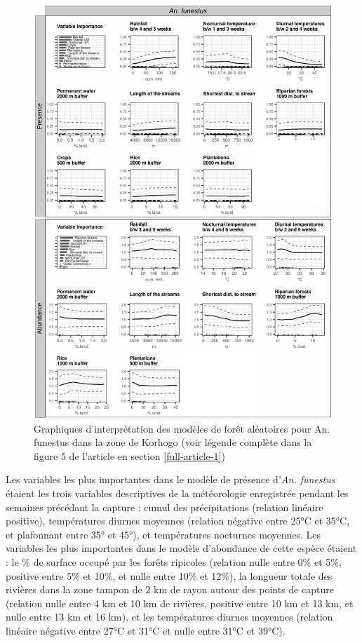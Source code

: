 \documentclass[12pt,twoside]{reedthesis}
\begin{document}
\begin{figure}

{\centering \includegraphics[width=1\linewidth]{figure/pdp_funestus_ci} 

}

\caption[Graphiques d'interprétation des modèles de forêt aléatoires pour An. funestus dans la zone de Korhogo]{Graphiques d'interprétation des modèles de forêt aléatoires pour An. funestus dans la zone de Korhogo (voir légende complète dans la figure 5 de l'article en section \ref{full-article-1})}\label{fig:pdp-ci-funestus}
\end{figure}
Les variables les plus importantes dans le modèle de présence d'\emph{An. funestus} étaient les trois variables descriptives de la météorologie enregistrée pendant les semaines précédant la capture : cumul des précipitations (relation linéaire positive), températures diurnes moyennes (relation négative entre 25°C et 35°C, et plafonnant entre 35° et 45°), et températures nocturnes moyennes. Les variables les plus importantes dans le modèle d'abondance de cette espèce étaient : le \% de surface occupé par les forêts ripicoles (relation nulle entre 0\% et 5\%, positive entre 5\% et 10\%, et nulle entre 10\% et 12\%), la longueur totale des rivières dans la zone tampon de 2 km de rayon autour des points de capture (relation nulle entre 4 km et 10 km de rivières, positive entre 10 km et 13 km, et nulle entre 13 km et 16 km), et les températures diurnes moyennes (relation linéaire négative entre 27°C et 31°C et nulle entre 31°C et 39°C).\\
\end{document}
